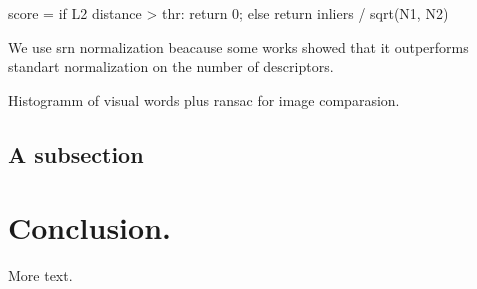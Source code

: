 \documentclass[11pt]{article} %
\begin{document}
score = 
if L2 distance > thr:
   return 0;
else 
 return inliers / sqrt(N1, N2)

We use srn normalization beacause some works\cite{jegou:inria-00602325} showed that it
outperforms standart normalization on the number of descriptors.


Histogramm of visual words plus ransac for image comparasion.

\subsection{A subsection}

\section{Conclusion.}

More text.



\end{document}
